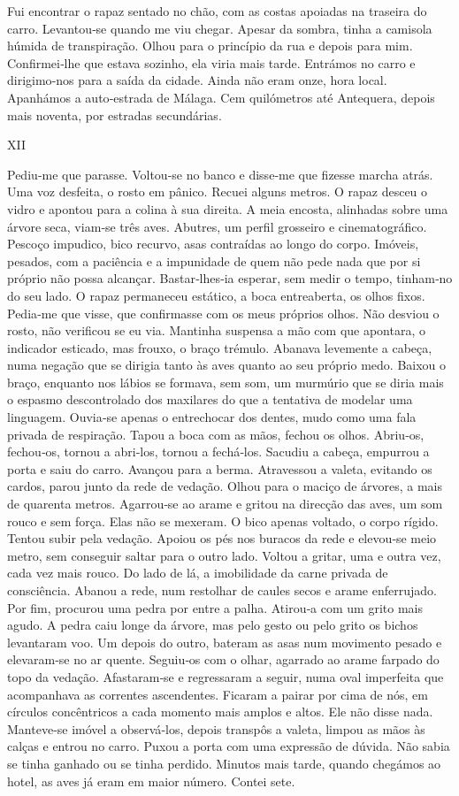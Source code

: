 Fui encontrar o rapaz sentado no chão, com as costas apoiadas na
traseira do carro. Levantou­‑se quando me viu chegar. Apesar da sombra,
tinha a camisola húmida de transpiração. Olhou para o princípio da rua e
depois para mim. Confirmei­‑lhe que estava sozinho, ela viria mais
tarde. Entrámos no carro e dirigimo­‑nos para a saída da cidade. Ainda
não eram onze, hora local. Apanhámos a auto­‑estrada de Málaga. Cem
quilómetros até Antequera, depois mais noventa, por estradas
secundárias.

XII

Pediu­‑me que parasse. Voltou­‑se no banco e disse­‑me que fizesse
marcha atrás. Uma voz desfeita, o rosto em pânico. Recuei alguns metros.
O rapaz desceu o vidro e apontou para a colina à sua direita. A meia
encosta, alinhadas sobre uma árvore seca, viam­‑se três aves. Abutres,
um perfil grosseiro e cinematográfico. Pescoço impudico, bico recurvo,
asas contraídas ao longo do corpo. Imóveis, pesados, com a paciência e a
impunidade de quem não pede nada que por si próprio não possa alcançar.
Bastar­‑lhes­‑ia esperar, sem medir o tempo, tinham­‑no do seu lado. O
rapaz permaneceu estático, a boca entreaberta, os olhos fixos. Pedia­‑me
que visse, que confirmasse com os meus próprios olhos. Não desviou o
rosto, não verificou se eu via. Mantinha suspensa a mão com que
apontara, o indicador esticado, mas frouxo, o braço trémulo. Abanava
levemente a cabeça, numa negação que se dirigia tanto às aves quanto ao
seu próprio medo. Baixou o braço, enquanto nos lábios se formava, sem
som, um murmúrio que se diria mais o espasmo descontrolado dos maxilares
do que a tentativa de modelar uma linguagem. Ouvia­‑se apenas o
entrechocar dos dentes, mudo como uma fala privada de respiração. Tapou
a boca com as mãos, fechou os olhos. Abriu­‑os, fechou­‑os, tornou a
abri­‑los, tornou a fechá­‑los. Sacudiu a cabeça, empurrou a porta e
saiu do carro. Avançou para a berma. Atravessou a valeta, evitando os
cardos, parou junto da rede de vedação. Olhou para o maciço de árvores,
a mais de quarenta metros. Agarrou­‑se ao arame e gritou na direcção das
aves, um som rouco e sem força. Elas não se mexeram. O bico apenas
voltado, o corpo rígido. Tentou subir pela vedação. Apoiou os pés nos
buracos da rede e elevou­‑se meio metro, sem conseguir saltar para o
outro lado. Voltou a gritar, uma e outra vez, cada vez mais rouco. Do
lado de lá, a imobilidade da carne privada de consciência. Abanou a
rede, num restolhar de caules secos e arame enferrujado. Por fim,
procurou uma pedra por entre a palha. Atirou­‑a com um grito mais agudo.
A pedra caiu longe da árvore, mas pelo gesto ou pelo grito os bichos
levantaram voo. Um depois do outro, bateram as asas num movimento pesado
e elevaram­‑se no ar quente. Seguiu­‑os com o olhar, agarrado ao arame
farpado do topo da vedação. Afastaram­‑se e regressaram a seguir, numa
oval imperfeita que acompanhava as correntes ascendentes. Ficaram a
pairar por cima de nós, em círculos concêntricos a cada momento mais
amplos e altos. Ele não disse nada. Manteve­‑se imóvel a observá­‑los,
depois transpôs a valeta, limpou as mãos às calças e entrou no carro.
Puxou a porta com uma expressão de dúvida. Não sabia se tinha ganhado ou
se tinha perdido. Minutos mais tarde, quando chegámos ao hotel, as aves
já eram em maior número. Contei sete.

